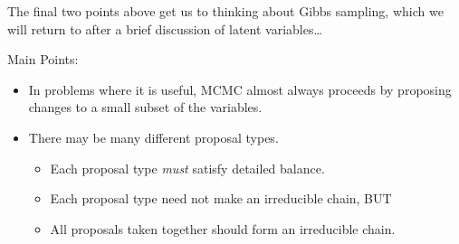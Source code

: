 The final two points above get us to thinking about Gibbs sampling, which we will return to after a brief discussion of latent variables\ldots



Main Points:
\begin{itemize}
\item In problems where it is useful, MCMC almost always proceeds by proposing changes to a small subset of the variables.
\item There may be many different proposal types.
\begin{itemize}
\item Each proposal type {\em must} satisfy detailed balance.
\item Each proposal type need not make an irreducible chain, BUT
\item All proposals taken together should form an irreducible chain.
\end{itemize}
\end{itemize}





